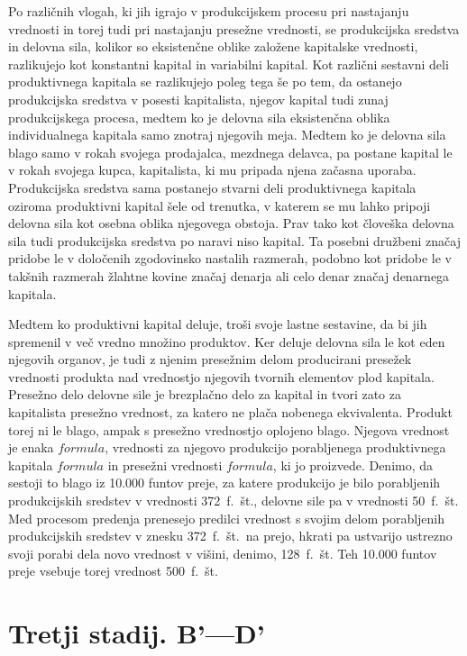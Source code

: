 \documentclass[a5paper]{scrbook}
\begin{document}
Po različnih vlogah, ki jih igrajo v produkcijskem procesu pri nastajanju vrednosti in torej tudi pri nastajanju presežne vrednosti, se produkcijska sredstva in delovna sila, kolikor so eksistenčne oblike založene kapitalske vrednosti, razlikujejo kot konstantni kapital in variabilni kapital. Kot različni sestavni deli produktivnega kapitala se razlikujejo poleg tega še po tem, da ostanejo produkcijska sredstva v posesti kapitalista, njegov kapital tudi zunaj produkcijskega procesa, medtem ko je delovna sila eksistenčna oblika individualnega kapitala samo znotraj njegovih meja. Medtem ko je delovna sila blago samo v rokah svojega prodajalca, mezdnega delavca, pa postane kapital le v rokah svojega kupca, kapitalista, ki mu pripada njena začasna uporaba. Produkcijska sredstva sama postanejo stvarni deli produktivnega kapitala oziroma produktivni kapital šele od trenutka, v katerem se mu lahko pripoji delovna sila kot osebna oblika njegovega obstoja. Prav tako kot človeška delovna sila tudi produkcijska sredstva po naravi niso kapital. Ta posebni družbeni značaj pridobe le v določenih zgodovinsko nastalih razmerah, podobno kot pridobe le v takšnih razmerah žlahtne kovine značaj denarja ali celo denar značaj denarnega kapitala.

Medtem ko produktivni kapital deluje, troši svoje lastne sestavine, da bi jih spremenil v več vredno množino produktov. Ker deluje delovna sila le kot eden njegovih organov, je tudi z njenim presežnim delom producirani presežek vrednosti produkta nad vrednostjo njegovih tvornih elementov plod kapitala. Presežno delo delovne sile je brezplačno delo za kapital in tvori zato za kapitalista presežno vrednost, za katero ne plača nobenega ekvivalenta. Produkt torej ni le blago, ampak s presežno vrednostjo oplojeno blago. Njegova vrednost je enaka \( formula \), vrednosti za njegovo produkcijo porabljenega produktivnega kapitala \( formula \) in presežni vrednosti \( formula \), ki jo proizvede. Denimo, da sestoji to blago iz 10.000 funtov preje, za katere produkcijo je bilo porabljenih produkcijskih sredstev v vrednosti 372~f.~št., delovne sile pa v vrednosti 50~f.~št. Med procesom predenja prenesejo predilci vrednost s svojim delom porabljenih produkcijskih sredstev v znesku 372~f.~št.\ na prejo, hkrati pa ustvarijo ustrezno svoji porabi dela novo vrednost v višini, denimo, 128~f.~št. Teh 10.000 funtov preje vsebuje torej vrednost 500~f.~št.

\section{Tretji stadij. B'---D'}
\end{document}

